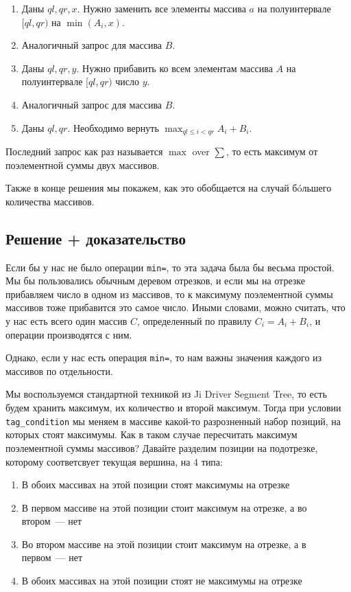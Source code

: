 \begin{enumerate}
    \item Даны $ql, qr, x$. Нужно заменить все элементы массива $a$ на полуинтервале $[ql, qr)$ на $\min(A_i, x)$.
    \item Аналогичный запрос для массива $B$.
    \item Даны $ql, qr, y$. Нужно прибавить ко всем элементам массива $A$ на полуинтервале $[ql, qr)$ число $y$.
    \item Аналогичный запрос для массива $B$.
    \item Даны $ql, qr$. Необходимо вернуть $\max_{ql \le i < qr} A_i + B_i$.
\end{enumerate}

Последний запрос как раз называется $\max$ over $\sum$, то есть максимум от поэлементной суммы двух массивов.

Также в конце решения мы покажем, как это обобщается на случай бóльшего количества массивов.

\subsection{Решение + доказательство}

Если бы у нас не было операции \verb+min=+, то эта задача была бы весьма простой. Мы бы пользовались обычным деревом отрезков, и если мы на отрезке прибавляем число в одном из массивов, то к максимуму поэлементной суммы массивов тоже прибавится это самое число. Иными словами, можно считать, что у нас есть всего один массив $C$, определенный по правилу $C_i = A_i + B_i$, и операции производятся с ним.

Однако, если у нас есть операция \verb+min=+, то нам важны значения каждого из массивов по отдельности.

Мы воспользуемся стандартной техникой из Ji Driver Segment Tree, то есть будем хранить максимум, их количество и второй максимум. Тогда при условии \verb+tag_condition+ мы меняем в массиве какой-то разрозненный набор позиций, на которых стоят максимумы. Как в таком случае пересчитать максимум поэлементной суммы массивов? Давайте разделим позиции на подотрезке, которому соответсвует текущая вершина, на 4 типа:

\begin{enumerate}
    \item В обоих массивах на этой позиции стоят максимумы на отрезке
    \item В первом массиве на этой позиции стоит максимум на отрезке, а во втором~--- нет
    \item Во втором массиве на этой позиции стоит максимум на отрезке, а в первом~--- нет
    \item В обоих массивах на этой позиции стоят не максимумы на отрезке
\end{enumerate}

